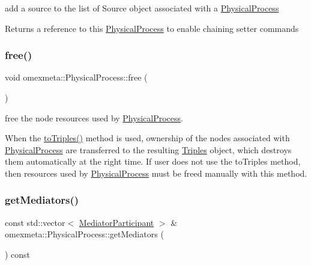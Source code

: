 add a source to the list of Source object associated with a \hyperlink{classomexmeta_1_1PhysicalProcess}{Physical\+Process} 

\begin{DoxyReturn}{Returns}
a reference to this \hyperlink{classomexmeta_1_1PhysicalProcess}{Physical\+Process} to enable chaining setter commands 
\end{DoxyReturn}
\mbox{\label{classomexmeta_1_1PhysicalProcess_a8dfcffe80f264ad24e70de9d7b71c73b}} 
\subsubsection{\texorpdfstring{free()}{free()}}
{\footnotesize\ttfamily void omexmeta\+::\+Physical\+Process\+::free (\begin{DoxyParamCaption}{ }\end{DoxyParamCaption})}



free the node resources used by \hyperlink{classomexmeta_1_1PhysicalProcess}{Physical\+Process}. 

When the \hyperlink{classomexmeta_1_1PhysicalProcess_ab6f6af00fac2401f9a88e186fd1d897a}{to\+Triples()} method is used, ownership of the nodes associated with \hyperlink{classomexmeta_1_1PhysicalProcess}{Physical\+Process} are transferred to the resulting \hyperlink{classomexmeta_1_1Triples}{Triples} object, which destroys them automatically at the right time. If user does not use the to\+Triples method, then resources used by \hyperlink{classomexmeta_1_1PhysicalProcess}{Physical\+Process} must be freed manually with this method. \mbox{\label{classomexmeta_1_1PhysicalProcess_a349b76ad1831d2510904510583f0d7f2}} 
\subsubsection{\texorpdfstring{get\+Mediators()}{getMediators()}}
{\footnotesize\ttfamily const std\+::vector$<$ \hyperlink{classomexmeta_1_1MediatorParticipant}{Mediator\+Participant} $>$ \& omexmeta\+::\+Physical\+Process\+::get\+Mediators (\begin{DoxyParamCaption}{ }\end{DoxyParamCaption}) const}



